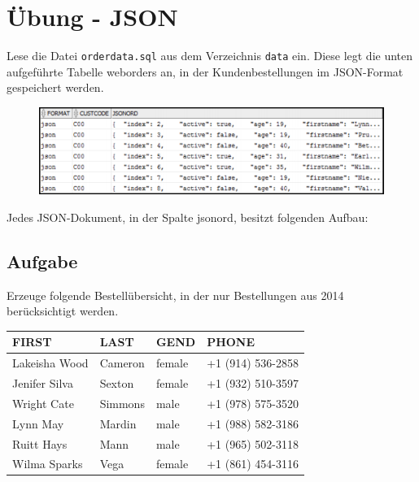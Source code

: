 \section{Übung - JSON}
\label{sec:uebung_10}
Lese die Datei \texttt{orderdata.sql} aus dem Verzeichnis \texttt{data} ein. Diese legt die unten aufgeführte Tabelle weborders an, in der Kundenbestellungen im JSON-Format gespeichert werden.

\begin{figure}[H]
  \centering
  \includegraphics[width=1\textwidth]{img//uebung_10_-_vorbereitung.png}
  \label{img:uebung_10_-_vorbereitung}
\end{figure}

Jedes JSON-Dokument, in der Spalte jsonord, besitzt folgenden Aufbau:

\subsection{Aufgabe}
\label{sec:uebung_10.aufgabe_01}
Erzeuge folgende Bestellübersicht, in der nur Bestellungen aus 2014 berücksichtigt werden.

\begin{table}[H]
  \centering
  \ttfamily
  \begin{tabular}{|l|l|l|l|}
    \hline
    \textbf{FIRST}  & \textbf{LAST}   & \textbf{GEND} & \textbf{PHONE}      \\
    \hline
    Lakeisha Wood   & Cameron         & female        & +1 (914) 536-2858   \\
    Jenifer Silva   & Sexton          & female        & +1 (932) 510-3597   \\
    Wright Cate     & Simmons         & male          & +1 (978) 575-3520   \\
    Lynn May        & Mardin          & male          & +1 (988) 582-3186   \\
    Ruitt Hays      & Mann            & male          & +1 (965) 502-3118   \\
    Wilma Sparks    & Vega            & female        & +1 (861) 454-3116   \\
    \hline
  \end{tabular}
\end{table}

